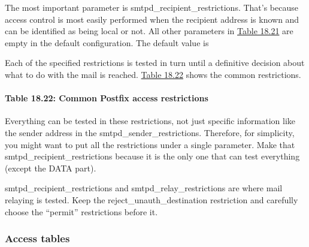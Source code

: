 
The most important parameter is {smtpd\_recipient\_restrictions}. That's
because access control is most easily performed when the recipient
address is known and can be identified as being local or not. All other
parameters in
\protect\hyperlink{part0026_split_063.htmlux5cux23_idTextAnchor1188}{Table
18.21} are empty in the default configuration. The default value is


Each of the specified restrictions is tested in turn until a definitive
decision about what to do with the mail is reached.
\protect\hyperlink{part0026_split_063.htmlux5cux23_idTextAnchor1189}{Table
18.22} shows the common restrictions.

\paragraph[{Table 18.22: }Common Postfix access
restrictions]{\texorpdfstring{{Table 18.22:
}\protect\hypertarget{part0026_split_063.htmlux5cux23_idTextAnchor1189}{}{}\protect\hypertarget{part0026_split_063.htmlux5cux23_idTextAnchor1190}{}{}Common
Postfix access
restrictions{\protect\hypertarget{part0026_split_063.htmlux5cux23_idIndexMarker2728}{}{}\protect\hypertarget{part0026_split_063.htmlux5cux23_idIndexMarker2729}{}{}\protect\hypertarget{part0026_split_063.htmlux5cux23_idIndexMarker2730}{}{}}}{Table 18.22: Common Postfix access restrictions}}


Everything can be tested in these restrictions, not just specific
information like the sender address in the
{smtpd\_sender\_restrictions}. Therefore, for simplicity, you might want
to put all the restrictions under a single parameter. Make that
{smtpd\_recipient\_restrictions }because it is the only one that can
test everything (except the DATA part).

{smtpd\_recipient\_restrictions} and {smtpd\_relay\_restrictions} are
where mail relaying is tested. Keep the {reject\_unauth\_destination}
restriction and carefully choose the ``permit'' restrictions before it.

\subsubsection[Access
tables]{\texorpdfstring{\protect\hypertarget{part0026_split_063.htmlux5cux23_idTextAnchor1191}{}{}Access
tables}{Access tables}}

